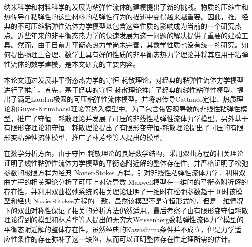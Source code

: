 
\begin{cabstract}
  纳米科学和材料科学的发展为粘弹性流体的建模提出了新的挑战。物质的压缩性和热传导在粘弹性的这些材料的粘弹性行为的描述中变得越来越重要。因此，推广经典的不可压缩粘弹性流体力学模型以包含这些性质的影响成为当前的一个研究热点。近些年来的非平衡态热力学的快速发展为这一问题的解决提供了重要的建模工具。然而，由于目前非平衡态热力学尚未完善，其数学性质也没有统一的研究。如何提出物理上合理、数学上具有好的性质的非平衡态热力学理论并将其应用于粘弹性流体的数学建模，是本文研究的主要内容。

本论文通过发展非平衡态热力学的守恒-耗散理论，对经典的粘弹性流体力学模型进行了推广。首先，基于经典的守恒-耗散理论推广了经典的线性粘弹性模型，提出了满足Laudau极限的可压粘弹性流体模型。并将热传导Cattaneo定律、热质理论和Guyer-Krumhansl理论等纳入模型中。为了包含带客观导数的非线性粘弹性模型，推广了守恒－耗散理论并发展了可压的非线性粘弹性流体力学模型。另外基于有限形变理论和守恒－耗散理论提出了有限形变守恒-耗散理论提出了可压的有限形变粘弹性流体模型，推广了林芳华等人提出的模型。

在数学分析方面，由于守恒-耗散理论的良好数学结构，采用双曲方程的相关理论证明了线性粘弹性流体力学模型的平衡态附近解的整体存在性，并严格证明了松弛参数的极限方程为经典 Navier-Stokes 方程。针对非线性粘弹性流体力学，利用双曲方程的相关理论分析了可压上对流导数 Maxwell模型在一维时的平衡态附近解的存在性，并利用双曲松弛系统的相关理论证明了一维时在松弛参数趋于 0 时该模型和经典 Navier-Stokes方程的一致，虽然该模型不是守恒形式的，但是一维情况下的双曲对称性保证了相关的分析方法仍然适用。最后考察了由有限形变守恒耗散理论得到的模型和林芳华等人提出的无穷大Weissenberg数粘弹性流体力学模型的平衡态附近解的整体存在性，虽然经典的Kawashima条件并不成立，但是力学适应性条件的存在弥补了这一缺陷，从而可以证明整体存在性定理所需的估计。 

\end{cabstract}

